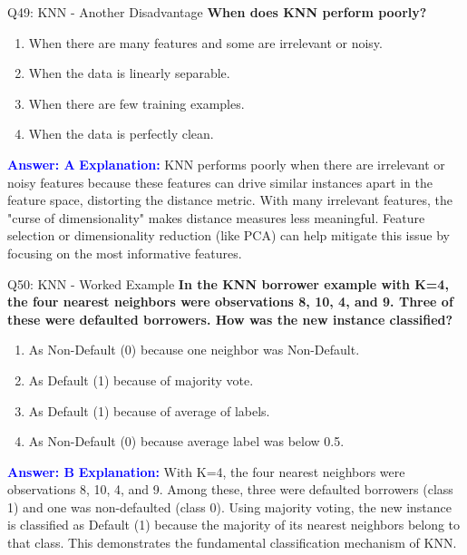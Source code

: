 \documentclass[8pt]{beamer}
\begin{document}
	\begin{frame}{Q49: KNN - Another Disadvantage}
		\fontsize{6.5}{7.5}\selectfont
		\textbf{When does KNN perform poorly?}
		\begin{enumerate}
			\item When there are many features and some are irrelevant or noisy.
			\item When the data is linearly separable.
			\item When there are few training examples.
			\item When the data is perfectly clean.
		\end{enumerate}
		\vspace{0.1cm}
		\textcolor{blue}{\textbf{Answer: A}}
		\vspace{0.1cm}
		\textcolor{blue}{\textbf{Explanation:}} KNN performs poorly when there are irrelevant or noisy features because these features can drive similar instances apart in the feature space, distorting the distance metric. With many irrelevant features, the "curse of dimensionality" makes distance measures less meaningful. Feature selection or dimensionality reduction (like PCA) can help mitigate this issue by focusing on the most informative features.
	\end{frame}
	
	\begin{frame}{Q50: KNN - Worked Example}
		\fontsize{6.5}{7.5}\selectfont
		\textbf{In the KNN borrower example with K=4, the four nearest neighbors were observations 8, 10, 4, and 9. Three of these were defaulted borrowers. How was the new instance classified?}
		\begin{enumerate}
			\item As Non-Default (0) because one neighbor was Non-Default.
			\item As Default (1) because of majority vote.
			\item As Default (1) because of average of labels.
			\item As Non-Default (0) because average label was below 0.5.
		\end{enumerate}
		\vspace{0.1cm}
		\textcolor{blue}{\textbf{Answer: B}}
		\vspace{0.1cm}
		\textcolor{blue}{\textbf{Explanation:}} With K=4, the four nearest neighbors were observations 8, 10, 4, and 9. Among these, three were defaulted borrowers (class 1) and one was non-defaulted (class 0). Using majority voting, the new instance is classified as Default (1) because the majority of its nearest neighbors belong to that class. This demonstrates the fundamental classification mechanism of KNN.
	\end{frame}
	
\end{document}
